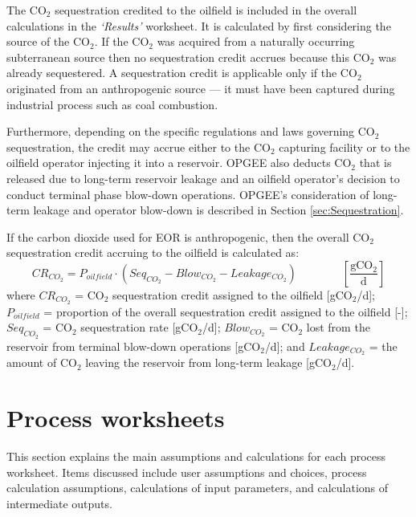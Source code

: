 \documentclass[11pt]{report}
\newcommand{\sheet}[1]{\textit{`{#1}'}}
\newcommand{\eqnunitfrac}[2]{\quad\quad \scriptstyle{\left[\frac{\text{#1}}{\text{#2}}\right]}}
\begin{document}
The CO$_2$ sequestration credited to the oilfield is included in the overall calculations in the \sheet{Results} worksheet. It is calculated by first considering the source of the CO$_2$. If the CO$_2$ was acquired from a naturally occurring subterranean source then no sequestration credit accrues because this CO$_2$ was already sequestered. A sequestration credit is applicable only if the CO$_2$ originated from an anthropogenic source --- it must have been captured during industrial process such as coal combustion. 

Furthermore, depending on the specific regulations and laws governing CO$_2$ sequestration, the credit may accrue either to the CO$_2$ capturing facility or to the oilfield operator injecting it into a reservoir. OPGEE also deducts CO$_2$ that is released due to long-term reservoir leakage and an oilfield operator's decision to conduct terminal phase blow-down operations. OPGEE's consideration of long-term leakage and operator blow-down is described in Section \ref{sec:Sequestration}.

If the carbon dioxide used for EOR is anthropogenic, then the overall CO$_2$ sequestration credit accruing to the oilfield is calculated as:
\begin{equation} \label{eq:SequestrationCredit}
CR_{CO_{2}} = P_{oilfield} \cdot (Seq_{CO_{2}} - Blow_{CO_{2}} - Leakage_{CO_{2}}) \quad\quad\eqnunitfrac{gCO$_2$}{d}
\end{equation}
 where $CR_{CO_{2}}$ = CO$_2$ sequestration credit assigned to the oilfield [gCO$_2$/d]; $P_{oilfield}$ = proportion of the overall sequestration credit assigned to the oilfield [-]; $Seq_{CO_{2}}$ = CO$_2$ sequestration rate [gCO$_2$/d]; $Blow_{CO_{2}}$ = CO$_2$ lost from the reservoir from terminal blow-down operations [gCO$_2$/d]; and $Leakage_{CO_{2}}$ = the amount of CO$_2$ leaving the reservoir from long-term leakage [gCO$_2$/d].





\chapter{Process worksheets}

This section explains the main assumptions and calculations for each process worksheet. Items discussed include user assumptions and choices, process calculation assumptions, calculations of input parameters, and calculations of intermediate outputs.
\end{document}
